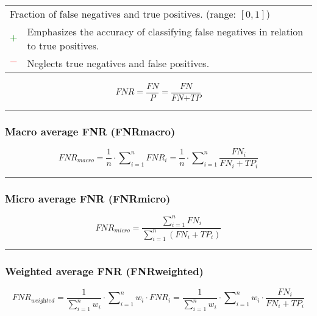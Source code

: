 \documentclass{article}
\begin{document}
\begin{table}[H]\centering
	\begin{tabular}{m{}m{}}
		\multicolumn{2}{m{0.95\textwidth}}{Fraction of false negatives and true positives. (range: $[0, 1]$)} \\
		\textcolor{Green}{$+$} & Emphasizes the accuracy of classifying false negatives in relation to true positives. \\
		\textcolor{Red}{$-$}   & Neglects true negatives and false positives.
	\end{tabular}
\end{table}

\begin{equation}
	\textit{FNR} = \dfrac{\textit{FN}}{\textit{P}} = \dfrac{\textit{FN}}{\textit{FN} + \textit{TP}}
%
	\label{equation:FNR}
\end{equation}

\hrule


\subsubsection{Macro average FNR (FNRmacro)}

\begin{equation}
	\textit{FNR}_\textit{macro} = \dfrac{1}{n} \cdot \sum\nolimits_{i = 1}^n \textit{FNR}_i = \dfrac{1}{n} \cdot \sum\nolimits_{i = 1}^n \dfrac{\textit{FN}_i}{\textit{FN}_i + \textit{TP}_i}
%
	\label{equation:MAAFNR}
\end{equation}

\hrule


\subsubsection{Micro average FNR (FNRmicro)}

\begin{equation}
	\textit{FNR}_\textit{micro} = \dfrac{\sum\nolimits_{i = 1}^n \textit{FN}_i}{\sum\nolimits_{i = 1}^n (\textit{FN}_i + \textit{TP}_i)}
%
	\label{equation:MIAFNR}
\end{equation}

\hrule


\subsubsection{Weighted average FNR (FNRweighted)}
\begin{equation}
	\textit{FNR}_\textit{weighted} = \dfrac{1}{\sum\nolimits_{i = 1}^n w_i} \cdot \sum\nolimits_{i = 1}^n w_i \cdot \textit{FNR}_i = \dfrac{1}{\sum\nolimits_{i = 1}^n w_i} \cdot \sum\nolimits_{i = 1}^n w_i \cdot \dfrac{\textit{FN}_i}{\textit{FN}_i + \textit{TP}_i}
%
	\label{equation:WAFNR}
\end{equation}
\end{document}
